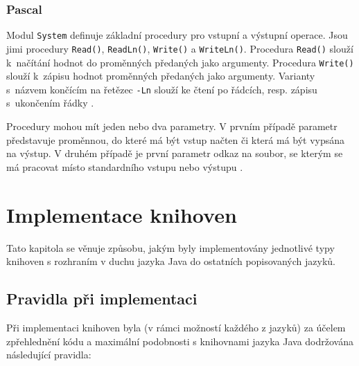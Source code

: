 \documentclass[onepage, a4paper, 12pt]{bakalarka}
\begin{document}
\subsection{Pascal}
Modul \texttt{System} definuje základní procedury pro vstupní a výstupní operace. Jsou jimi procedury \texttt{Read()}, \texttt{ReadLn()}, \texttt{Write()} a \texttt{WriteLn()}. Procedura \texttt{Read()} slouží k~načítání hodnot do proměnných předaných jako argumenty. Procedura \texttt{Write()} slouží k~zápisu hodnot proměnných předaných jako argumenty. Varianty s~názvem končícím na řetězec \texttt{-Ln} slouží ke čtení po řádcích, resp. zápisu s~ukončením řádky \cite{pas-guide-system, pas-guide-read, pas-guide-write, pas-guide-readln, pas-guide-writeln}.\par
Procedury mohou mít jeden nebo dva parametry. V prvním případě parametr představuje proměnnou, do které má být vstup načten či která má být vypsána na výstup. V druhém případě je první parametr odkaz na soubor, se kterým se má pracovat místo standardního vstupu nebo výstupu \cite{pas-guide-read, pas-guide-write, pas-guide-readln, pas-guide-writeln}.

\chapter{Implementace knihoven}
Tato kapitola se věnuje způsobu, jakým byly implementovány jednotlivé typy knihoven s rozhraním v duchu jazyka Java do ostatních popisovaných jazyků.

\section{Pravidla při implementaci}
Při implementaci knihoven byla (v rámci možností každého z jazyků) za účelem zpřehlednění kódu a maximální podobnosti s knihovnami jazyka Java dodržována následující pravidla:
\end{document}
